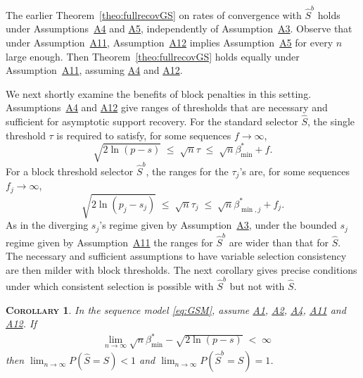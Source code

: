 \documentclass[bj,authoryear]{imsart}
\theoremstyle{plain}
\newtheorem{cor}[thm]{\textsc{Corollary}}
\begin{document}
The earlier Theorem~\ref{theo:fullrecovGS} on rates of convergence with $\hat S^b$ holds under Assumptions~\hyperlink{lab:A4}{A4} and \hyperlink{lab:A5}{A5}, independently of Assumption~\hyperlink{lab:A3}{A3}. Observe that under Assumption~\hyperlink{lab:A11}{A11}, Assumption~\hyperlink{lab:A12}{A12} implies Assumption~\hyperlink{lab:A5}{A5} for every $n$ large enough. Then Theorem~\ref{theo:fullrecovGS} holds equally under Assumption~\hyperlink{lab:A11}{A11}, assuming  \hyperlink{lab:A4}{A4} and \hyperlink{lab:A12}{A12}.

We next shortly examine the benefits of block penalties in this setting. Assumptions~\hyperlink{lab:A4}{A4} and \hyperlink{lab:A12}{A12} give ranges of thresholds that are necessary and sufficient for asymptotic support recovery. For the standard selector $\hat S$, the single threshold $\tau$ is required to satisfy, for some
sequences $f\to \infty$,
\begin{equation*}
    \sqrt{2\ln(p-s)} \;\leq \;\sqrt{n}\tau\; \leq\; \sqrt{n}\beta_{\min}^* + f.
\end{equation*}
For a block threshold selector $\hat S^b$, the ranges for the $\tau_j$'s are, for some sequences $f_j\to \infty$,
\begin{equation*}
  \sqrt{2\ln(p_j-s_j)} \;\leq\; \sqrt{n}\tau_j \;\leq\; \sqrt{n}\beta_{\min,j}^* + f_j.
\end{equation*}
As in the diverging $s_j$'s regime given by Assumption~\hyperlink{lab:A3}{A3}, under the bounded $s_j$ regime given by Assumption~\hyperlink{lab:A11}{A11} the ranges for $\hat S^b$ are wider than that for $\hat S$. The necessary and 
sufficient assumptions to have variable selection consistency are then milder with block thresholds. The next corollary gives precise conditions under which consistent selection is possible with $\hat S^b$ but not with $\hat S$.
\begin{cor}\label{cor:sfin}
 In the sequence model \eqref{eq:GSM}, assume \hyperlink{lab:A1}{A1}, \hyperlink{lab:A2}{A2}, \hyperlink{lab:A4}{A4}, \hyperlink{lab:A11}{A11} and \hyperlink{lab:A12}{A12}.  If
\begin{eqnarray*}
&\lim_{n\to\infty}\sqrt{n}\beta_{\min}^*-\sqrt{2\ln(p-s)} \;<\;\infty
\end{eqnarray*}
then 
$\lim_{n\to\infty}P(\hat{S} = S)< 1$ and $\lim_{n\to\infty}P(\hat{S}^{b} = S)= 1$.  
\end{cor}
\end{document}
